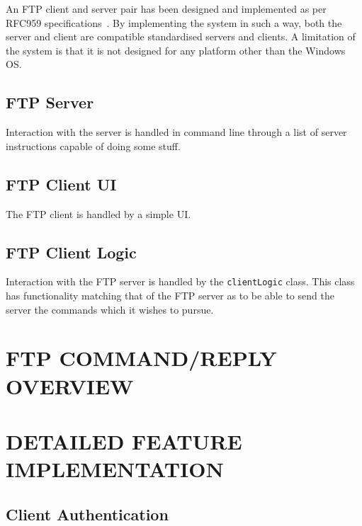 \documentclass[10pt,twocolumn]{witseiepaper}
\begin{document}
An FTP client and server pair has been designed and implemented as per RFC959 specifications~\cite{rfc959}. By implementing the system in such a way, both the server and client are compatible standardised servers and clients. A limitation of the system is that it is not designed for any platform other than the Windows OS.

\subsection{FTP Server}

Interaction with the server is handled in command line through a list of server instructions capable of doing some stuff.

\subsection{FTP Client UI}

The FTP client is handled by a simple UI. %


\subsection{FTP Client Logic}

Interaction with the FTP server is handled by the \texttt{clientLogic} class. This class has functionality matching that of the FTP server as to be able to send the server the commands which it wishes to pursue. 



\section{FTP COMMAND/REPLY OVERVIEW} %



\section{DETAILED FEATURE IMPLEMENTATION} %

\subsection{Client Authentication}
\end{document}
